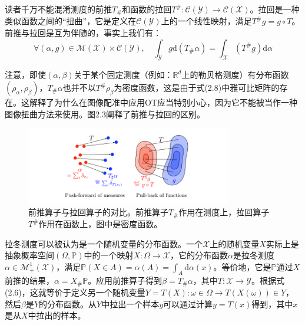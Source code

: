 \documentclass[cn,10pt,math=newtx,citestyle=gb7714-2015,bibstyle=gb7714-2015]{elegantbook}
\begin{document}
\begin{postulate}[前推与拉回的对比]

读者千万不能混淆测度的前推$T_\#$和函数的拉回$T^\#:\mathcal{C(Y)}\to\mathcal{C(X)}$。拉回是一种类似函数之间的“扭曲”，它是定义在$\mathcal{C(Y)}$上的一个线性映射，满足$T^\# g=g\circ T$。前推与拉回是互为伴随的，事实上我们有：
\begin{equation*}
    \forall (\alpha,g)\in \mathcal{M(X)}\times \mathcal{C(Y)},\quad \int_\mathcal{Y}g\text{d}(T_\# \alpha)=\int_\mathcal{X} (T^\# g)\text{d}\alpha
\end{equation*}

注意，即使$(\alpha,\beta)$关于某个固定测度（例如：$\mathbb{R}^d$上的勒贝格测度）有分布函数$(\rho_\alpha,\rho_\beta)$，$T_\# \alpha$也并不以$T^\# \rho_\beta$为密度函数，这是由于式(2.8)中雅可比矩阵的存在。这解释了为什么在图像配准中应用OT应当特别小心，因为它不能被当作一种图像扭曲方法来使用。图2.3阐释了前推与拉回的区别。

\end{postulate}

\begin{figure}[H]
    \centering
    \includegraphics[width=0.8\textwidth]{figure/fig2.3.png}
    \caption{前推算子与拉回算子的对比。前推算子$T_\#$作用在测度上，拉回算子$T^\#$作用在函数上，图中是密度函数。}
    \label{图2.3}
\end{figure}

\begin{postulate}[测度与随机向量]
    拉冬测度可以被认为是一个随机变量的分布函数。一个$\mathcal{X}$上的随机变量$X$实际上是抽象概率空间$(\Omega,\mathbb{P})$中的一个映射$X:\Omega\to\mathcal{X}$，它的分布函数$\alpha$是拉冬测度$\alpha\in\mathcal{M}_+^1(\mathcal{X})$，满足$\mathbb{P}(X\in A)=\alpha(A)=\int_A \text{d}\alpha(x)$。等价地，它是$\mathbb{P}$通过$X$前推的结果，$\alpha=X_\#\mathbb{P}$。应用前推算子得到$\beta=T_\# \alpha$，其中$T:\mathcal{X}\to \mathcal{Y}$。根据式(2.6)，这就等价于定义另一个随机变量$Y=T(X):\omega\in\Omega\to T(X(\omega))\in Y$，然后$\beta$是$Y$的分布函数。从$Y$中拉出一个样本$y$可以通过计算$y=T(x)$得到，其中$x$是从$X$中拉出的样本。
\end{postulate}
\end{document}
